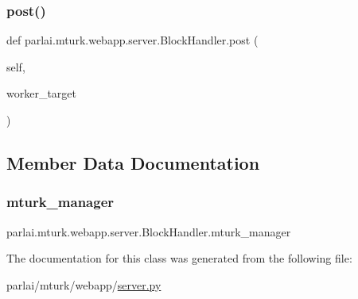 \subsubsection{\texorpdfstring{post()}{post()}}
{\footnotesize\ttfamily def parlai.\+mturk.\+webapp.\+server.\+Block\+Handler.\+post (\begin{DoxyParamCaption}\item[{}]{self,  }\item[{}]{worker\+\_\+target }\end{DoxyParamCaption})}



\subsection{Member Data Documentation}
\mbox{\label{classparlai_1_1mturk_1_1webapp_1_1server_1_1BlockHandler_a478088460fbd6c910d6ca6bcb01b7016}} 
\subsubsection{\texorpdfstring{mturk\+\_\+manager}{mturk\_manager}}
{\footnotesize\ttfamily parlai.\+mturk.\+webapp.\+server.\+Block\+Handler.\+mturk\+\_\+manager}



The documentation for this class was generated from the following file\+:\begin{DoxyCompactItemize}
\item 
parlai/mturk/webapp/\hyperlink{server_8py}{server.\+py}\end{DoxyCompactItemize}
